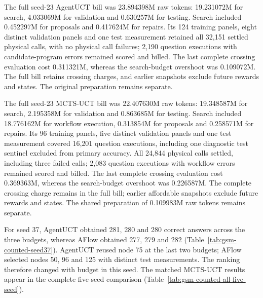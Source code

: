 The full seed-23 AgentUCT bill was 23.894398M raw tokens: 19.231072M
for search, 4.033069M for validation and 0.630257M for testing. Search
included 0.452297M for proposals and 0.417624M for repairs. Its 124
training panels, eight distinct validation panels and one test measurement
retained all 32,151 settled physical calls, with no physical call failures;
2,190 question executions with candidate-program errors remained scored
and billed. The last complete crossing evaluation cost 0.311321M,
whereas the search-budget overshoot was 0.109072M. The full bill retains
crossing charges, and earlier snapshots exclude future rewards and states.
The original preparation remains separate.

The full seed-23 MCTS-UCT bill was 22.407630M raw tokens: 19.348587M
for search, 2.195358M for validation and 0.863685M for testing. Search
included 18.776162M for workflow execution, 0.313854M for proposals and
0.258571M for repairs. Its 96 training panels, five distinct validation
panels and one test measurement covered 16,201 question executions,
including one diagnostic test sentinel excluded from primary accuracy.
All 24,844 physical calls settled, including three failed calls; 2,083
question executions with workflow errors remained scored and billed.
The last complete crossing evaluation cost 0.369363M, whereas the
search-budget overshoot was 0.226587M. The complete crossing charge
remains in the full bill; earlier affordable snapshots exclude future
rewards and states. The
shared preparation of 0.109983M raw tokens remains separate.

For seed 37, AgentUCT obtained 281, 280 and 280 correct answers across
the three budgets, whereas AFlow obtained 277, 279 and 282
(Table~\ref{tab:gsm-counted-seed37}). AgentUCT reused node 75 at the last
two budgets; AFlow selected nodes 50, 96 and 125 with distinct test
measurements. The ranking therefore changed with budget in this seed.
The matched MCTS-UCT results appear in the complete five-seed comparison
(Table~\ref{tab:gsm-counted-all-five-seed}).

